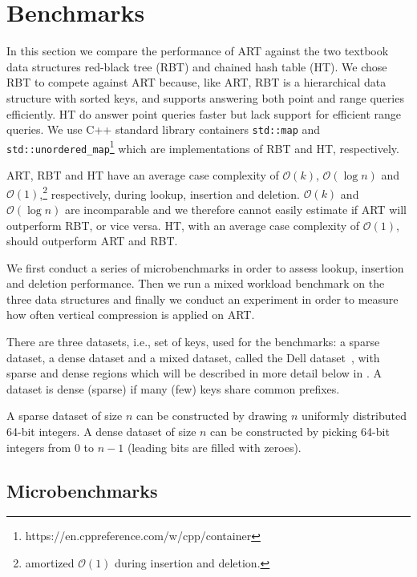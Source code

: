 \documentclass[abstracton,12pt]{scrartcl}
\theoremstyle{definition}
\begin{document}
\newpage

\section{Benchmarks}\label{sec:benchmarks}

In this section we compare the performance of ART against the two textbook
data structures red-black tree (RBT) and chained hash table (HT).
We chose RBT to compete against ART because, like ART, RBT is a hierarchical
data structure with sorted keys, and supports answering both point and range
queries efficiently. HT do answer point queries faster but lack support for
efficient range queries. We use C++ standard library containers 
\texttt{std::map} and \texttt{std::unordered\_map}\footnote{https://en.cppreference.com/w/cpp/container}
which are implementations of RBT and HT, respectively.

ART, RBT and HT have an average case complexity of $\mathcal{O}(k)$, 
$\mathcal{O}(\log{}n)$ and $\mathcal{O}(1)$,\footnote{amortized
$\mathcal{O}(1)$ during insertion and deletion.} respectively, 
during lookup, insertion and deletion. $\mathcal{O}(k)$ and 
$\mathcal{O}(\log{}n)$ are incomparable and we therefore cannot easily 
estimate if ART will outperform RBT, or vice versa. HT, with an average case 
complexity of $\mathcal{O}(1)$, should outperform ART and RBT.

We first conduct a series of microbenchmarks in order to assess lookup,
insertion and deletion performance. Then we run a mixed workload benchmark
on the three data structures and finally we conduct an experiment in order
to measure how often vertical compression is applied on ART. 

There are three datasets, i.e., set of keys, used for the benchmarks: a sparse
dataset, a dense dataset and a mixed dataset, called the Dell
dataset~\cite{wellenzohn2017wapi}, with sparse and dense regions which
will be described in more detail below in . 
A dataset is dense (sparse) if many (few) keys share common prefixes. 

A sparse dataset of size $n$ can be constructed by drawing $n$ uniformly 
distributed 64-bit integers. A dense dataset of size $n$ can be constructed 
by picking 64-bit integers from $0$ to $n - 1$ (leading bits are filled with 
zeroes).

\vspace{-3mm}
\subsection{Microbenchmarks}\label{sec:microbenchmarks}
\end{document}

